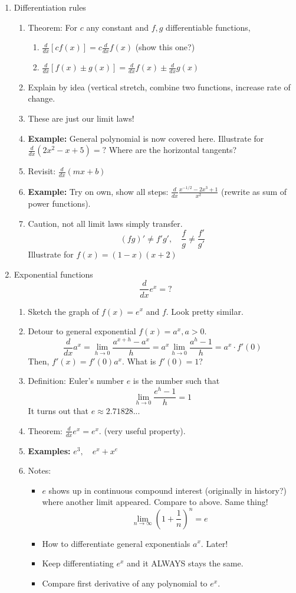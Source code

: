 \documentclass{article}
\begin{document}
\begin{enumerate}
\item Differentiation rules
\begin{enumerate}
\item Theorem: For $c$ any constant and $f,g$ differentiable functions, 
\begin{enumerate}
\item $\frac{d}{dx} [cf(x)] = c\frac{d}{dx}f(x)$ (show this one?)
\item $\frac{d}{dx}[f(x)\pm g(x)] = \frac{d}{dx}f(x)\pm\frac{d}{dx}g(x)$
\end{enumerate}
\item Explain by idea (vertical stretch, combine two functions, increase rate of change.
\item These are just our limit laws!
\item {\bf Example: } General polynomial is now covered here. Illustrate for $\frac{d}{dx}(2x^2 - x + 5)=?$ Where are the horizontal tangents?
\item Revisit: $\frac{d}{dx}(mx+b)$
\item {\bf Example: } Try on own, show all steps: $\frac{d}{dx} \frac{x^{-1/2}-2x^3+1}{x^2}$ (rewrite as sum of power functions).
\item Caution, not all limit laws simply transfer.
$$
(fg)' \neq f'g',\quad \frac{f}{g}\neq \frac{f'}{g'}
$$
Illustrate for $f(x) = (1-x)(x+2)$
\end{enumerate}

\item Exponential functions
$$
\frac{d}{dx}e^x = ?
$$
\begin{enumerate}
\item Sketch the graph of $f(x) = e^x$ and $f$. Look pretty similar.
\item Detour to general exponential $f(x) = a^x, a>0$.
$$
\frac{d}{dx} a^x = \lim_{h\rightarrow 0} \frac{a^{x+h}-a^x}{h} 
= a^x \lim_{h\rightarrow 0} \frac{a^{h}-1}{h} 
= a^x \cdot f'(0)
$$
Then, $f'(x) = f'(0) a^x$. What is $f'(0)=1$?
\item Definition: Euler's number $e$ is the number such that 
$$
\lim_{h\rightarrow 0} \frac{e^{h}-1}{h} = 1
$$
It turns out that $e \approx 2.71828...$
\item Theorem: $\frac{d}{dx} e^x = e^x$. (very useful property).
\item {\bf Examples: } $e^3,\quad e^x+x^e$
\item Notes:
\begin{itemize}
\item $e$ shows up in continuous compound interest (originally in history?) where another limit appeared. Compare to above. Same thing!
$$
\lim_{n\rightarrow \infty} (1+\frac{1}{n})^n = e
$$
\item How to differentiate general exponentials $a^x$. Later!
\item Keep differentiating $e^x$ and it ALWAYS stays the same. 
\item Compare first derivative of any polynomial to $e^x$.
\end{itemize}
\end{enumerate}
\end{enumerate}
\end{document}

